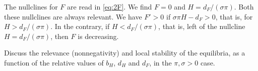 \documentclass[12pt]{article}
\theoremstyle{plain}
\begin{document}
The nullclines for $F$ are read in \eqref{eq:2F}. We find $F=0$ and $H=d_F/(\sigma\pi)$. Both these nullclines are always relevant. We have $F'>0$ if $\sigma\pi H-d_F>0$, that is, for $H>d_F/(\sigma\pi)$. In the contrary, if $H<d_F/(\sigma\pi)$, that is, left of the nullcline $H=d_F/(\sigma\pi)$, then $F$ is decreasing.

Discuss the relevance (nonnegativity) and local stability of the equilibria, as a function of the relative values of $b_H$, $d_H$ and $d_F$, in the $\pi,\sigma>0$ case.
\end{document}

